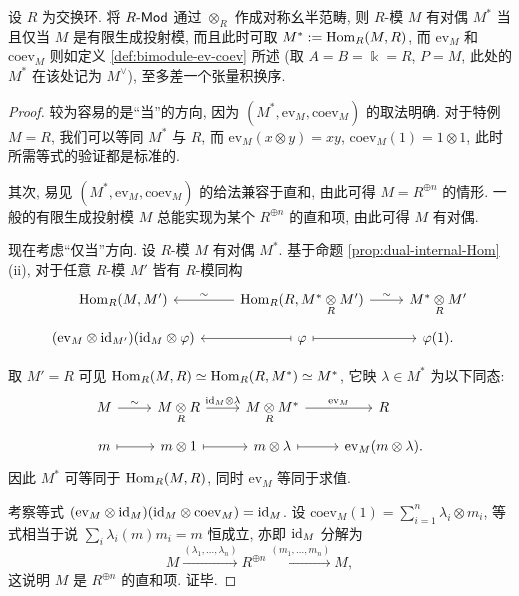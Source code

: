 \begin{proposition}\label{prop:dualizable-module}
	设 $R$ 为交换环. 将 $R\text{-}\mathsf{Mod}$ 通过 $\otimes_R$ 作成对称幺半范畴, 则 $R$-模 $M$ 有对偶 $M^*$ 当且仅当 $M$ 是有限生成投射模, 而且此时可取 $M^* := \operatorname{Hom}_R(M, R)$, 而 $\mathrm{ev}_M$ 和 $\mathrm{coev}_M$ 则如定义 \ref{def:bimodule-ev-coev} 所述 (取 $A=B=\Bbbk=R$, $P=M$, 此处的 $M^*$ 在该处记为 $M^\vee$), 至多差一个张量积换序.
\end{proposition}
\begin{proof}
	较为容易的是``当''的方向, 因为 $(M^*, \mathrm{ev}_M, \mathrm{coev}_M)$ 的取法明确. 对于特例 $M = R$, 我们可以等同 $M^*$ 与 $R$, 而 $\mathrm{ev}_M(x \otimes y) = xy$, $\mathrm{coev}_M(1) = 1 \otimes 1$, 此时所需等式的验证都是标准的.
	
	其次, 易见 $(M^*, \mathrm{ev}_M, \mathrm{coev}_M)$ 的给法兼容于直和, 由此可得 $M = R^{\oplus n}$ 的情形. 一般的有限生成投射模 $M$ 总能实现为某个 $R^{\oplus n}$ 的直和项, 由此可得 $M$ 有对偶.
	
	现在考虑``仅当''方向. 设 $R$-模 $M$ 有对偶 $M^*$. 基于命题 \ref{prop:dual-internal-Hom} (ii), 对于任意 $R$-模 $M'$ 皆有 $R$-模同构
	\[\begin{tikzcd}[row sep=tiny]
		\Hom_R(M, M') & \Hom_R(R, M^* \dotimes{R} M') \arrow[l, "\sim"'] \arrow[r, "\sim"] & M^* \dotimes{R} M' \\
		(\mathrm{ev}_M \otimes \identity_{M'}) (\identity_M \otimes \varphi) & \varphi \arrow[mapsto, l] \arrow[mapsto, r] & \varphi(1).
	\end{tikzcd}\]
	
	取 $M' = R$ 可见 $\operatorname{Hom}_R(M, R) \simeq \operatorname{Hom}_R(R, M^*) \simeq M^*$, 它映 $\lambda \in M^*$ 为以下同态:
	\[\begin{tikzcd}[row sep=tiny]
		M \arrow[r, "\sim"] & M \dotimes{R} R \arrow[r, "{\identity_M \otimes \lambda}"] & M \dotimes{R} M^* \arrow[r, "{\mathrm{ev}_M}"] & R \\ 
		m \arrow[mapsto, r] & m \otimes 1 \arrow[mapsto, r] & m \otimes \lambda \arrow[mapsto, r] & \mathrm{ev}_M(m \otimes \lambda).
	\end{tikzcd}\]
	因此 $M^*$ 可等同于 $\operatorname{Hom}_R(M, R)$, 同时 $\mathrm{ev}_M$ 等同于求值.
	
	考察等式 $(\mathrm{ev}_M \otimes \mathrm{id}_M)(\mathrm{id}_M \otimes \mathrm{coev}_M) = \mathrm{id}_M$. 设 $\mathrm{coev}_M(1) = \sum_{i=1}^n \lambda_i \otimes m_i$, 等式相当于说 $\sum_i \lambda_i(m) m_i = m$ 恒成立, 亦即 $\mathrm{id}_M$ 分解为
	\[ M \xrightarrow{(\lambda_1, \ldots, \lambda_n)} R^{\oplus n} \xrightarrow{(m_1, \ldots, m_n)} M, \]
	这说明 $M$ 是 $R^{\oplus n}$ 的直和项. 证毕.
\end{proof}

